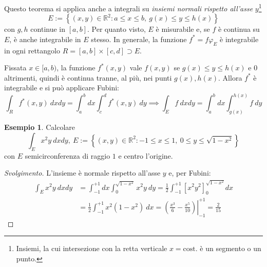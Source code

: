 \documentclass[10pt, a4paper]{scrartcl}
\newenvironment{svolgimento}{\renewcommand\qedsymbol{$\blacksquare$}\begin{proof}[Svolgimento]}{\end{proof}}
\theoremstyle{definition}
\newtheorem{esempio}{Esempio}
\numberwithin{esempio}{section}
\theoremstyle{definition}
\numberwithin{obs}{section}
\numberwithin{nota}{section}
\newcommand*\Eval[3]{\left.#1\right\rvert_{#2}^{#3}}
\numberwithin{equation}{subsection}
\begin{document}
\noindent Questo teorema si applica anche a integrali su \textit{insiemi normali rispetto all'asse} $y$\footnote{Insiemi, la cui intersezione con la retta verticale $x=\text{cost.}$ \`e un segmento o un punto.}
\[
E := \left\{ (x,y) \in \mathbb{R}^2 : a\le x\le b , \ g(x) \le  y \le h(x) \right\} 
\] 
con $g,h$ continue in $[a,b]$. Per quanto visto, $E$ \`e misurabile e, se $f$ \`e continua su $E$, \`e anche integrabile in $E$ stesso. 
In generale, la funzione $f^* = f \varphi _E$ \`e integrabile in ogni rettangolo $R = [a,b] \times  [c,d] \supset E$.

Fissata $x \in [a,b)$, la funzione $f^*(x,y)$ vale $f(x,y)$ se $g(x) \le  y \le h(x)$ e $0$ altrimenti, quindi \`e continua tranne, al pi\`u, nei punti $g(x), h(x)$. Allora $f^*$ \`e integrabile e si pu\`o applicare Fubini:
\[
	\int_{R} f^*(x,y) \ dxdy = \int_{a} ^b dx \int_{c} ^d f^*(x,y) \ dy \implies \int_{E} f \ dxdy = \int_{a} ^b dx \int_{g(x)} ^{h(x)} f \ dy
\] 
\begin{esempio}
Calcolare
\[
\int_{E} x^2 y \ dxdy, \ E := \left\{ (x,y) \in \mathbb{R}^2:-1\le x\le 1 , \ 0 \le  y \le  \sqrt{1-x^2}  \right\} 
\] 
con $E$ semicirconferenza di raggio $1$ e centro l'origine.
\begin{svolgimento}
	L'insieme \`e normale rispetto all'asse $y$ e, per Fubini:
	\[
	\begin{split}
		\int_E x^2  y \ dxdy &= \int_{-1} ^{+1} dx \int_{0} ^{\sqrt{1-x^2} } x^2 y \ dy = \frac{1}{2}\int_{-1} ^{+1} \left[ x^2 y^2 \right] _{0} ^{\sqrt{1-x^2} }  dx\\
				     &= \frac{1}{2}\int_{-1} ^{+1} x ^2 (1-x^2) \ dx = \Eval{\left(\frac{x^3}{6}- \frac{x^5}{10}\right) }{-1}{+1} = \frac{2}{15}
	\end{split}
	\] 
	
\end{svolgimento}
\end{esempio}
\end{document}

